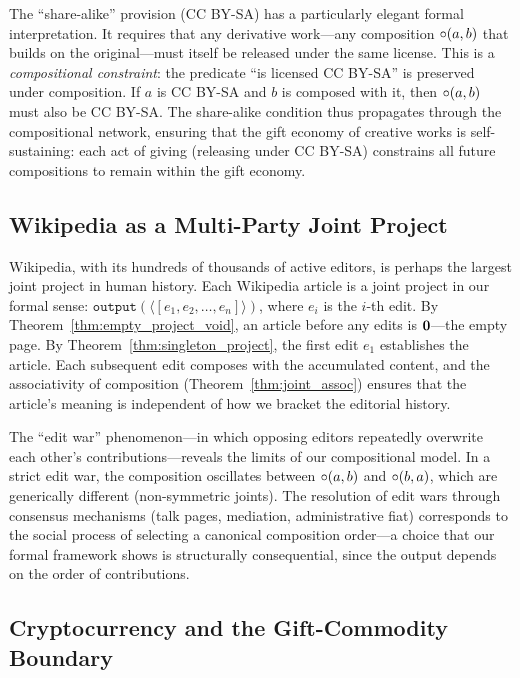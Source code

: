 The ``share-alike'' provision (CC BY-SA) has a particularly elegant
formal interpretation.  It requires that any derivative work---any
composition $\circ(a, b)$ that builds on the original---must itself
be released under the same license.  This is a \emph{compositional
constraint}: the predicate ``is licensed CC BY-SA'' is preserved under
composition.  If $a$ is CC BY-SA and $b$ is composed with it, then
$\circ(a, b)$ must also be CC BY-SA.  The share-alike condition
thus propagates through the compositional network, ensuring that the
gift economy of creative works is self-sustaining: each act of giving
(releasing under CC BY-SA) constrains all future compositions to
remain within the gift economy.

\subsection{Wikipedia as a Multi-Party Joint Project}

Wikipedia, with its hundreds of thousands of active editors, is perhaps
the largest joint project in human history.  Each Wikipedia article is a
joint project in our formal sense: $\texttt{output}(\langle [e_1, e_2,
\ldots, e_n] \rangle)$, where $e_i$ is the $i$-th edit.  By
Theorem~\ref{thm:empty_project_void}, an article before any edits is
$\mathbf{0}$---the empty page.  By Theorem~\ref{thm:singleton_project}, the
first edit $e_1$ establishes the article.  Each subsequent edit composes
with the accumulated content, and the associativity of composition
(Theorem~\ref{thm:joint_assoc}) ensures that the article's meaning is
independent of how we bracket the editorial history.

The ``edit war'' phenomenon---in which opposing editors repeatedly
overwrite each other's contributions---reveals the limits of our
compositional model.  In a strict edit war, the composition oscillates
between $\circ(a, b)$ and $\circ(b, a)$, which are generically
different (non-symmetric joints).  The resolution of edit wars through
consensus mechanisms (talk pages, mediation, administrative fiat)
corresponds to the social process of selecting a canonical composition
order---a choice that our formal framework shows is structurally
consequential, since the output depends on the order of contributions.

\subsection{Cryptocurrency and the Gift-Commodity Boundary}

